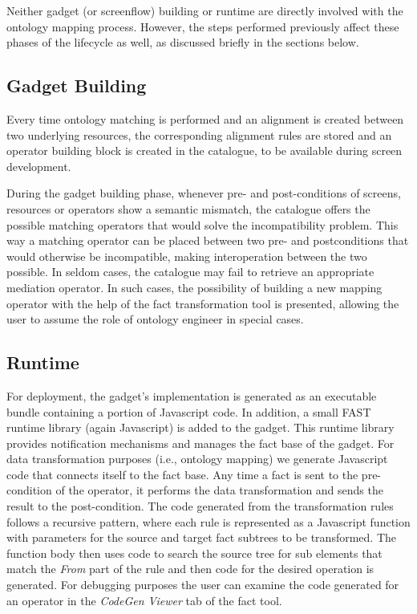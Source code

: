 Neither gadget (or screenflow) building or runtime are directly involved with the ontology mapping process. However, the steps performed previously affect these phases of the lifecycle as well, as discussed briefly in the sections below.

\subsection{Gadget Building} %
\label{sec:gadgetbuilding}

Every time ontology matching is performed and an alignment is created between two underlying resources, the corresponding alignment rules are stored and an operator building block is created in the catalogue, to be available during screen development. 

During the gadget building phase, whenever pre- and post-conditions of screens, resources or operators show a semantic mismatch, the catalogue offers the possible matching operators that would solve the incompatibility problem. This way a matching operator can be placed between two pre- and postconditions that would otherwise be incompatible, making interoperation between the two possible. In seldom cases, the catalogue may fail to retrieve an appropriate mediation operator. In such cases, the possibility of building a new mapping operator with the help of the fact transformation tool is presented, allowing the user to assume the role of ontology engineer in special cases.  

\subsection{Runtime} 
\label{sec:runtime}
For deployment, the gadget's implementation is generated as an executable bundle containing a portion of Javascript code. In addition, a small FAST runtime library (again Javascript) is added to the gadget. This runtime library provides notification mechanisms and manages the fact base of the gadget. For data transformation purposes (i.e., ontology mapping) we generate Javascript code that connects itself to the fact base. Any time a fact is sent to the pre-condition of the operator, it performs the data transformation and sends the result to the post-condition. The code generated from the transformation rules follows a recursive pattern, where each rule is represented as a Javascript function with parameters for the source and target fact subtrees to be transformed. The function body then uses code to search the source tree for sub elements that match the \textit{From} part of the rule and then code for the desired operation is generated. For debugging purposes the user can examine the code generated for an operator in the \textit{CodeGen Viewer} tab of the fact tool. 

